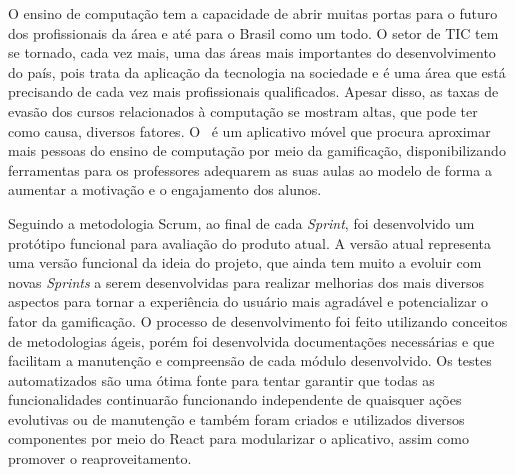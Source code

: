 

O ensino de computação tem a capacidade de abrir muitas portas para o futuro dos profissionais da área e até para o Brasil como um todo. O setor de TIC tem se tornado, cada vez mais, uma das áreas mais importantes do desenvolvimento do país, pois trata da aplicação da tecnologia na sociedade e é uma área que está precisando de cada vez mais profissionais qualificados. Apesar disso, as taxas de evasão dos cursos relacionados à computação se mostram altas, que pode ter como causa, diversos fatores. O \appName\ é um aplicativo móvel que procura aproximar mais pessoas do ensino de computação por meio da gamificação, disponibilizando ferramentas para os professores adequarem as suas aulas ao modelo de forma a aumentar a motivação e o engajamento dos alunos.


Seguindo a metodologia Scrum, ao final de cada \textit{Sprint}, foi desenvolvido um protótipo funcional para avaliação do produto atual. A versão atual representa uma versão funcional da ideia do projeto, que ainda tem muito a evoluir com novas \textit{Sprints} a serem desenvolvidas para realizar melhorias dos mais diversos aspectos para tornar a experiência do usuário mais agradável e potencializar o fator da gamificação. O processo de desenvolvimento foi feito utilizando conceitos de metodologias ágeis, porém foi desenvolvida documentações necessárias e que facilitam a manutenção e compreensão de cada módulo desenvolvido. Os testes automatizados
são uma ótima fonte para tentar garantir que todas as funcionalidades continuarão funcionando independente de quaisquer ações evolutivas ou de manutenção e também foram criados e utilizados diversos componentes por meio do React para modularizar o aplicativo, assim como promover o reaproveitamento.

